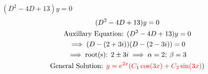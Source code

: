 \item [9.] $(D^2-4D+13)y=0$
\begin{gather*}
    (D^2-4D+13)y=0\\
    \text{Auxillary Equation: }(D^2-4D+13)y=0\\
    \implies (D-(2+3i))(D-(2-3i))=0\\
    \implies \text{root(s): } 2\pm 3i \implies \alpha=2;\:\beta=3\\
    \text{General Solution: } \textcolor{red}{y=e^{2x}(C_1\cos(3x)+C_2\sin(3x)})
\end{gather*}
